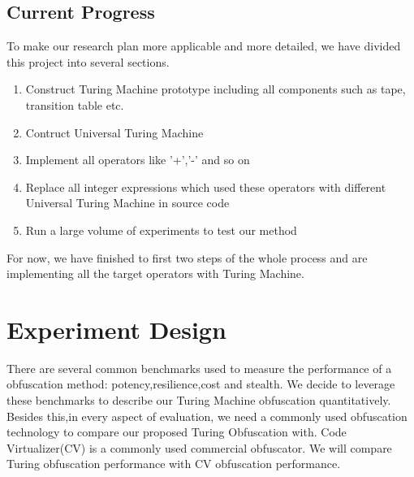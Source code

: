 \documentclass{sig-alternate-05-2015}
\begin{document}
\subsection{Current Progress}
To make our research plan more applicable and more detailed, we have divided this project into several sections.
\begin{enumerate}  
\item Construct Turing Machine prototype including all components such as tape, transition table etc.
\item Contruct Universal Turing Machine
\item Implement all operators like '+','-' and so on
\item Replace all integer expressions which used these operators with different Universal Turing Machine in source code
\item Run a large volume of experiments to test our method
\end{enumerate}

For now, we have finished to first two steps of the whole process and are implementing all the target operators with Turing Machine.


\section{Experiment Design}
There are several common benchmarks used to measure the performance of a obfuscation method: potency,resilience,cost and stealth. We decide to leverage these benchmarks to describe our Turing Machine obfuscation quantitatively. Besides this,in every aspect of evaluation, we need a commonly used obfuscation technology to compare our proposed Turing Obfuscation with. Code Virtualizer(CV) is a commonly used commercial obfuscator. We will compare Turing obfuscation performance with CV obfuscation performance.
\end{document}
